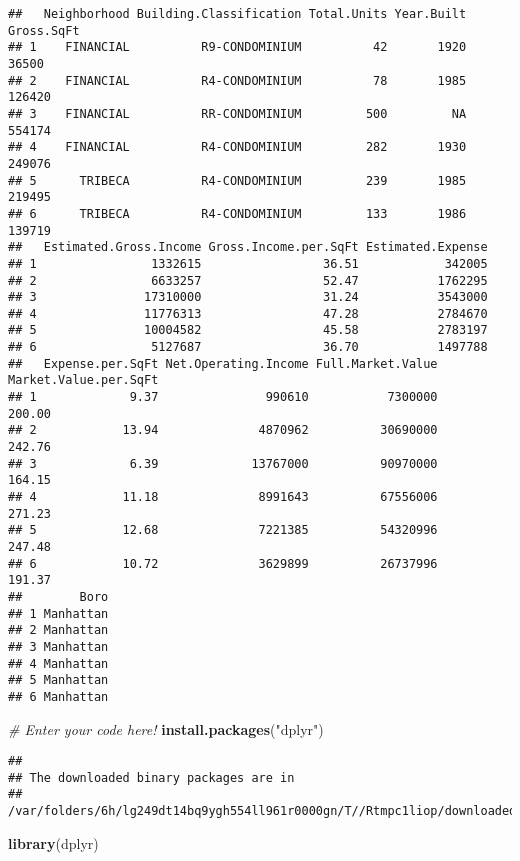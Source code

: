 \documentclass[
]{article}
\newenvironment{Shaded}{\begin{snugshade}}{\end{snugshade}}
\newcommand{\CommentTok}[1]{\textcolor[rgb]{0.56,0.35,0.01}{\textit{#1}}}
\newcommand{\FunctionTok}[1]{\textcolor[rgb]{0.13,0.29,0.53}{\textbf{#1}}}
\newcommand{\NormalTok}[1]{#1}
\newcommand{\StringTok}[1]{\textcolor[rgb]{0.31,0.60,0.02}{#1}}
\begin{document}
\begin{verbatim}
##   Neighborhood Building.Classification Total.Units Year.Built Gross.SqFt
## 1    FINANCIAL          R9-CONDOMINIUM          42       1920      36500
## 2    FINANCIAL          R4-CONDOMINIUM          78       1985     126420
## 3    FINANCIAL          RR-CONDOMINIUM         500         NA     554174
## 4    FINANCIAL          R4-CONDOMINIUM         282       1930     249076
## 5      TRIBECA          R4-CONDOMINIUM         239       1985     219495
## 6      TRIBECA          R4-CONDOMINIUM         133       1986     139719
##   Estimated.Gross.Income Gross.Income.per.SqFt Estimated.Expense
## 1                1332615                 36.51            342005
## 2                6633257                 52.47           1762295
## 3               17310000                 31.24           3543000
## 4               11776313                 47.28           2784670
## 5               10004582                 45.58           2783197
## 6                5127687                 36.70           1497788
##   Expense.per.SqFt Net.Operating.Income Full.Market.Value Market.Value.per.SqFt
## 1             9.37               990610           7300000                200.00
## 2            13.94              4870962          30690000                242.76
## 3             6.39             13767000          90970000                164.15
## 4            11.18              8991643          67556006                271.23
## 5            12.68              7221385          54320996                247.48
## 6            10.72              3629899          26737996                191.37
##        Boro
## 1 Manhattan
## 2 Manhattan
## 3 Manhattan
## 4 Manhattan
## 5 Manhattan
## 6 Manhattan
\end{verbatim}

\begin{Shaded}
\begin{Highlighting}[]
\CommentTok{\# Enter your code here!}
\FunctionTok{install.packages}\NormalTok{(}\StringTok{"dplyr"}\NormalTok{)  }
\end{Highlighting}
\end{Shaded}

\begin{verbatim}
## 
## The downloaded binary packages are in
##  /var/folders/6h/lg249dt14bq9ygh554ll961r0000gn/T//Rtmpc1liop/downloaded_packages
\end{verbatim}

\begin{Shaded}
\begin{Highlighting}[]
\FunctionTok{library}\NormalTok{(dplyr)}
\end{Highlighting}
\end{Shaded}
\end{document}
